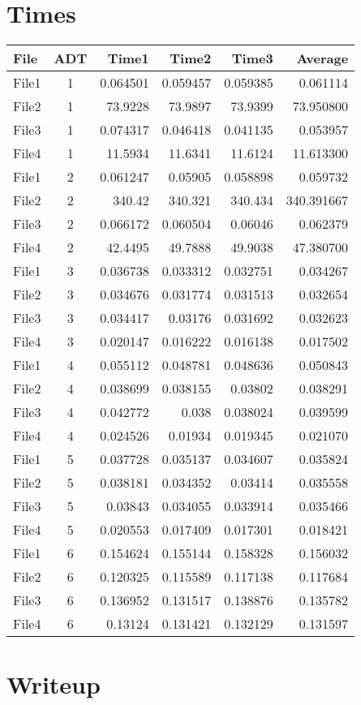\documentclass[12pt]{article}
\begin{document}
\section{Times}
\begin{center}
    \begin{tabular}{l c r r r r}
        File & ADT & Time1 & Time2 & Time3 & Average \\  

        \hline %
        File1 & 1 & 0.064501 & 0.059457 & 0.059385 & 0.061114 \\
        File2 & 1 & 73.9228 & 73.9897 & 73.9399 & 73.950800 \\
        File3 & 1 & 0.074317 & 0.046418 & 0.041135 & 0.053957 \\
        File4 & 1 & 11.5934 & 11.6341 & 11.6124 & 11.613300 \\
        \hline %
        File1 & 2 & 0.061247 & 0.05905 & 0.058898 & 0.059732 \\
        File2 & 2 & 340.42 & 340.321 & 340.434 & 340.391667 \\
        File3 & 2 & 0.066172 & 0.060504 & 0.06046 & 0.062379 \\
        File4 & 2 & 42.4495 & 49.7888 & 49.9038 & 47.380700 \\
        \hline %
        File1 & 3 & 0.036738 & 0.033312 & 0.032751 & 0.034267 \\
        File2 & 3 & 0.034676 & 0.031774 & 0.031513 & 0.032654 \\
        File3 & 3 & 0.034417 & 0.03176 & 0.031692 & 0.032623 \\
        File4 & 3 & 0.020147 & 0.016222 & 0.016138 & 0.017502 \\
        \hline %
        File1 & 4 & 0.055112 & 0.048781 & 0.048636 & 0.050843 \\
        File2 & 4 & 0.038699 & 0.038155 & 0.03802 & 0.038291 \\
        File3 & 4 & 0.042772 & 0.038 & 0.038024 & 0.039599 \\
        File4 & 4 & 0.024526 & 0.01934 & 0.019345 & 0.021070 \\
        \hline %
        File1 & 5 & 0.037728 & 0.035137 & 0.034607 & 0.035824 \\
        File2 & 5 & 0.038181 & 0.034352 & 0.03414 & 0.035558 \\
        File3 & 5 & 0.03843 & 0.034055 & 0.033914 & 0.035466 \\
        File4 & 5 & 0.020553 & 0.017409 & 0.017301 & 0.018421 \\
        \hline %
        File1 & 6 & 0.154624 & 0.155144 & 0.158328 & 0.156032 \\
        File2 & 6 & 0.120325 & 0.115589 & 0.117138 & 0.117684 \\
        File3 & 6 & 0.136952 & 0.131517 & 0.138876 & 0.135782 \\
        File4 & 6 & 0.13124 & 0.131421 & 0.132129 & 0.131597
    \end{tabular}
\end{center}



\section{Writeup}

\begin{doublespace}
    \lipsum[1-7]
\end{doublespace}
\end{document}
